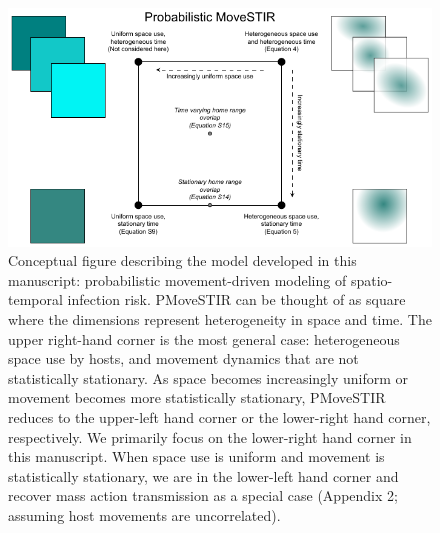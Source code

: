 \documentclass[letterpaper]{article}
\begin{document}
\clearpage


\begin{figure}
    \includegraphics[width=\textwidth]{figures/conceptual_figure_pmovestir_mod.pdf}
    \caption{Conceptual figure describing the model developed in this manuscript: probabilistic movement-driven modeling of spatio-temporal infection risk. PMoveSTIR can be thought of as square where the dimensions represent heterogeneity in space and time. The upper right-hand corner is the most general case: heterogeneous space use by hosts, and movement dynamics that are not statistically stationary.  As space becomes increasingly uniform or movement becomes more statistically stationary, PMoveSTIR reduces to the upper-left hand corner or the lower-right hand corner, respectively.  We primarily focus on the lower-right hand corner in this manuscript.  When space use is uniform and movement is statistically stationary, we are in the lower-left hand corner and recover mass action transmission as a special case (Appendix 2; assuming host movements are uncorrelated).}
	\label{fig:square}
\end{figure}
\end{document}
